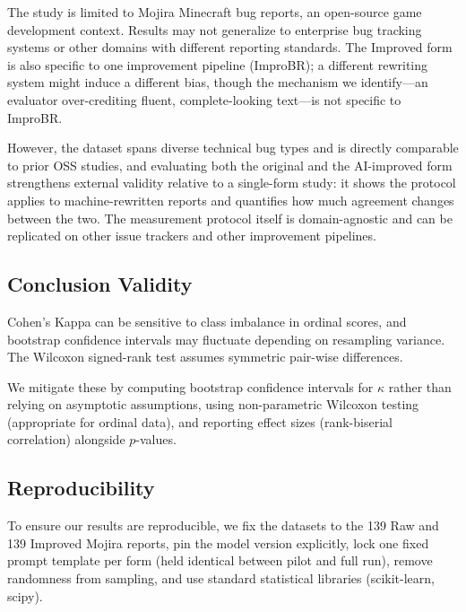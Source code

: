 The study is limited to Mojira Minecraft bug reports, an open-source game development context. Results may not generalize to enterprise bug tracking systems or other domains with different reporting standards. The Improved form is also specific to one improvement pipeline (ImproBR); a different rewriting system might induce a different bias, though the mechanism we identify---an evaluator over-crediting fluent, complete-looking text---is not specific to ImproBR.
 
However, the dataset spans diverse technical bug types and is directly comparable to prior OSS studies, and evaluating both the original and the AI-improved form strengthens external validity relative to a single-form study: it shows the protocol applies to machine-rewritten reports and quantifies how much agreement changes between the two. The measurement protocol itself is domain-agnostic and can be replicated on other issue trackers and other improvement pipelines.
 
\subsection{Conclusion Validity}
 
Cohen's Kappa can be sensitive to class imbalance in ordinal scores, and bootstrap confidence intervals may fluctuate depending on resampling variance. The Wilcoxon signed-rank test assumes symmetric pair-wise differences.
 
We mitigate these by computing bootstrap confidence intervals for $\kappa$ rather than relying on asymptotic assumptions, using non-parametric Wilcoxon testing (appropriate for ordinal data), and reporting effect sizes (rank-biserial correlation) alongside $p$-values.
 
\subsection{Reproducibility}
 
To ensure our results are reproducible, we fix the datasets to the 139 Raw and 139 Improved Mojira reports, pin the model version explicitly, lock one fixed prompt template per form (held identical between pilot and full run), remove randomness from sampling, and use standard statistical libraries (scikit-learn, scipy).
 